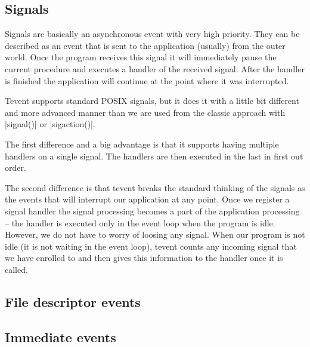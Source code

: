 \subsection{Signals}

Signals are basically an asynchronous event with very high priority. They can be
described as an event that is sent to the application (usually) from the outer
world. Once the program receives this signal it will immediately pause the
current procedure and executes a handler of the received signal. After the
handler is finished the application will continue at the point where it was
interrupted.

Tevent supports standard POSIX signals, but it does it with a little bit
different and more advanced manner than we are used from the classic approach
with |signal()| or |sigaction()|.

The first difference and a big advantage is that it supports having multiple
handlers on a single signal. The handlers are then executed in the last
in first out order.

The second difference is that tevent breaks the standard thinking of the
signals as the events that will interrupt our application at any point. Once we
register a signal handler the signal processing becomes a part of the
application processing -- the handler is executed only in the event loop when
the program is idle. However, we do not have to worry of loosing any signal.
When our program is not idle (it is not waiting in the event loop), tevent
counts any incoming signal that we have enrolled to and then gives this
information to the handler once it is called.



\subsection{File descriptor events}

\subsection{Immediate events}
